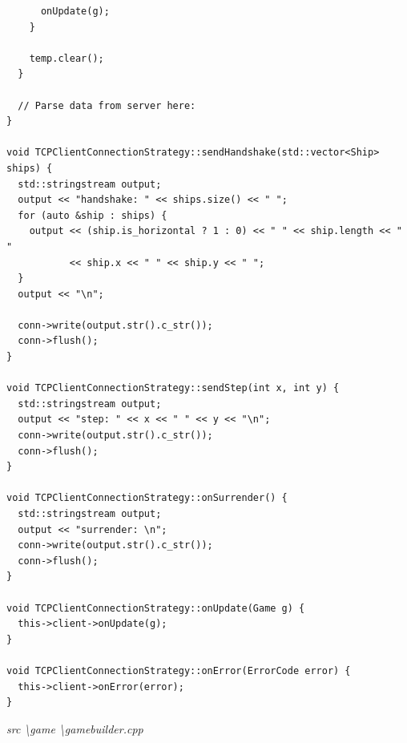 \documentclass[a4paper,14pt]{extarticle}
\begin{document}
\begin{verbatim}
      onUpdate(g);
    }

    temp.clear();
  }

  // Parse data from server here:
}

void TCPClientConnectionStrategy::sendHandshake(std::vector<Ship> ships) {
  std::stringstream output;
  output << "handshake: " << ships.size() << " ";
  for (auto &ship : ships) {
    output << (ship.is_horizontal ? 1 : 0) << " " << ship.length << " "
           << ship.x << " " << ship.y << " ";
  }
  output << "\n";

  conn->write(output.str().c_str());
  conn->flush();
}

void TCPClientConnectionStrategy::sendStep(int x, int y) {
  std::stringstream output;
  output << "step: " << x << " " << y << "\n";
  conn->write(output.str().c_str());
  conn->flush();
}

void TCPClientConnectionStrategy::onSurrender() {
  std::stringstream output;
  output << "surrender: \n";
  conn->write(output.str().c_str());
  conn->flush();
}

void TCPClientConnectionStrategy::onUpdate(Game g) {
  this->client->onUpdate(g);
}

void TCPClientConnectionStrategy::onError(ErrorCode error) {
  this->client->onError(error);
}

\end{verbatim}
\textit{src \textbackslash game \textbackslash gamebuilder.cpp}
\end{document}
